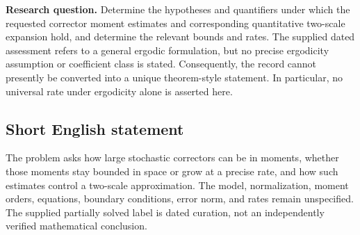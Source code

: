\documentclass[11pt]{article}
\begin{document}
\textbf{Research question.} Determine the hypotheses and quantifiers under which the requested corrector moment estimates and corresponding quantitative two-scale expansion hold, and determine the relevant bounds and rates. The supplied dated assessment refers to a general ergodic formulation, but no precise ergodicity assumption or coefficient class is stated. Consequently, the record cannot presently be converted into a unique theorem-style statement. In particular, no universal rate under ergodicity alone is asserted here.
\subsection{Short English statement}
The problem asks how large stochastic correctors can be in moments, whether those moments stay bounded in space or grow at a precise rate, and how such estimates control a two-scale approximation. The model, normalization, moment orders, equations, boundary conditions, error norm, and rates remain unspecified. The supplied partially solved label is dated curation, not an independently verified mathematical conclusion.
\end{document}
